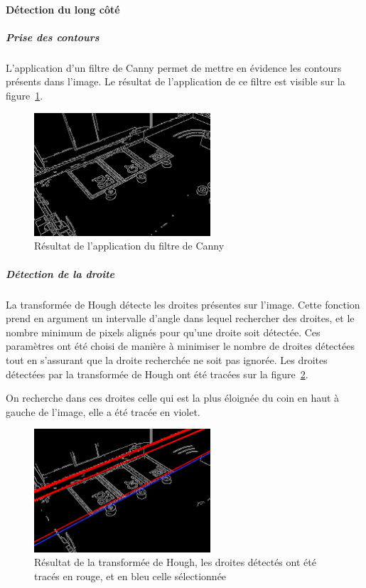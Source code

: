 \documentclass{article}
\begin{document}
\paragraph{Détection du long côté}
\subparagraph{Prise des contours}
L’application d’un filtre de Canny permet de mettre en évidence les contours présents dans l’image.
Le résultat de l’application de ce filtre est visible sur la figure~\ref{canny1}.
\begin{figure}[!h]
\begin{center} 
\includegraphics[height=130pt]{image_Canny.png}  
\end{center}
\caption{Résultat de l'application du filtre de Canny}
\label{canny1}
\end{figure}

\subparagraph{Détection de la droite}
La transformée de Hough détecte les droites présentes sur l’image. Cette fonction prend en argument un intervalle d’angle dans lequel rechercher des droites,
et le nombre minimum de pixels alignés pour qu’une droite soit détectée. Ces paramètres ont été choisi de manière à minimiser le nombre de droites détectées tout
en s’assurant que la droite recherchée ne soit pas ignorée. Les droites détectées par la transformée de Hough ont été tracées sur la figure~\ref{hough1}.

On recherche dans ces droites celle qui est la plus éloignée du coin en haut à gauche de l’image, elle a été tracée en violet.
\begin{figure}[!h]
\begin{center}
\includegraphics[height=130pt]{image_Canny_hough1.png}  
\end{center}
\caption{Résultat de la transformée de Hough, les droites détectés ont été tracés en rouge, et en bleu celle sélectionnée}
\label{hough1}
\end{figure}
\end{document}
